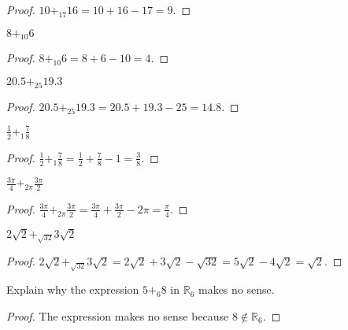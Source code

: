 \begin{proof}
    $10 {+}_{17} 16 = 10 + 16 - 17 = 9$.
\end{proof}

\begin{exercise}
    $8 {+}_{10} 6$
\end{exercise}

\begin{proof}
    $8 {+}_{10} 6 = 8 + 6 - 10 = 4$.
\end{proof}

\begin{exercise}
    $20.5 {+}_{25} 19.3$
\end{exercise}

\begin{proof}
    $20.5 {+}_{25} 19.3 = 20.5 + 19.3 - 25 = 14.8$.
\end{proof}

\begin{exercise}
    $\frac{1}{2} {+}_{1} \frac{7}{8}$
\end{exercise}

\begin{proof}
    $\frac{1}{2} {+}_{1} \frac{7}{8} = \frac{1}{2} + \frac{7}{8} - 1 = \frac{3}{8}$.
\end{proof}

\begin{exercise}
    $\frac{3\pi}{4} {+}_{2\pi} \frac{3\pi}{2}$
\end{exercise}

\begin{proof}
    $\frac{3\pi}{4} {+}_{2\pi} \frac{3\pi}{2} = \frac{3\pi}{4} + \frac{3\pi}{2} - 2\pi = \frac{\pi}{4}$.
\end{proof}

\begin{exercise}
    $2\sqrt{2} {+}_{\sqrt{32}} 3\sqrt{2}$
\end{exercise}

\begin{proof}
    $2\sqrt{2} {+}_{\sqrt{32}} 3\sqrt{2} = 2\sqrt{2} + 3\sqrt{2} - \sqrt{32} = 5\sqrt{2} - 4\sqrt{2} = \sqrt{2}$.
\end{proof}

\begin{exercise}
    Explain why the expression $5 {+}_{6} 8$ in $\mathbb{R}_{6}$ makes no sense.
\end{exercise}

\begin{proof}
    The expression makes no sense because $8\notin \mathbb{R}_{6}$.
\end{proof}

